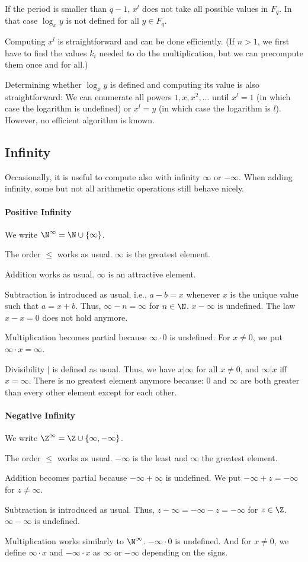 If the period is smaller than $q-1$, $x^l$ does not take all possible values in $F_q$.
In that case $\log_x y$ is not defined for all $y\in F_q$.
\medskip

Computing $x^l$ is straightforward and can be done efficiently.
(If $n>1$, we first have to find the values $k_i$ needed to do the multiplication, but we can precompute them once and for all.)

Determining whether $\log_x y$ is defined and computing its value is also straightforward: We can enumerate all powers $1,x,x^2,\ldots$ until $x^l=1$ (in which case the logarithm is undefined) or $x^l=y$ (in which case the logarithm is $l$).
However, no efficient algorithm is known.

\subsection{Infinity}\label{sec:math:infty}

Occasionally, it is useful to compute also with infinity $\infty$ or $-\infty$.
When adding infinity, some but not all arithmetic operations still behave nicely.

\paragraph{Positive Infinity}
We write $\N^\infty=\N\cup\{\infty\}$.

The order $\leq$ works as usual.
$\infty$ is the greatest element.

Addition works as usual.
$\infty$ is an attractive element.

Subtraction is introduced as usual, i.e., $a-b=x$ whenever $x$ is the unique value such that $a=x+b$.
Thus, $\infty-n=\infty$ for $n\in \N$.
$x-\infty$ is undefined.
The law $x-x=0$ does not hold anymore.

Multiplication becomes partial because $\infty\cdot 0$ is undefined.
For $x\neq 0$, we put $\infty\cdot x=\infty$.

Divisibility $|$ is defined as usual.
Thus, we have $x|\infty$ for all $x\neq 0$, and $\infty|x$ iff $x=\infty$.
There is no greatest element anymore because: $0$ and $\infty$ are both greater than every other element except for each other.

\paragraph{Negative Infinity}
We write $\Z^\infty=\Z\cup\{\infty,-\infty\}$.

The order $\leq$ works as usual.
$-\infty$ is the least and $\infty$ the greatest element.

Addition becomes partial because $-\infty+\infty$ is undefined.
We put $-\infty+z=-\infty$ for $z\neq\infty$.

Subtraction is introduced as usual.
Thus, $z-\infty=-\infty-z=-\infty$ for $z\in \Z$.
$\infty-\infty$ is undefined.

Multiplication works similarly to $\N^\infty$.
$-\infty\cdot 0$ is undefined.
And for $x\neq 0$, we define $\infty\cdot x$ and $-\infty\cdot x$ as $\infty$ or $-\infty$ depending on the signs.

